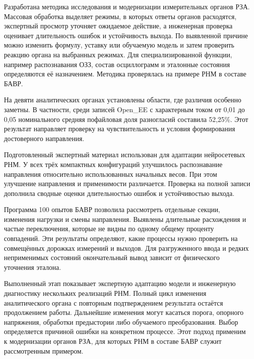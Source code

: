 Разработана методика исследования и модернизации измерительных органов РЗА. Массовая
обработка выделяет режимы, в которых ответы органов расходятся, экспертный просмотр
уточняет ожидаемое действие, а инженерная проверка оценивает длительность ошибок и
устойчивость выхода. По выявленной причине можно изменить формулу, уставку или обучаемую
модель и затем проверить реакцию органа на выбранных режимах. Для специализированной
функции, например распознавания ОЗЗ, состав осциллограмм и эталонные состояния
определяются её назначением. Методика проверялась на примере РНМ в составе БАВР.

На девяти аналитических органах установлены области,
где различия особенно заметны. В частности, среди записей
Open\_EE с характерным током от 0,01 до 0,05 номинального
средняя пофайловая доля разногласий составила 52,25\%.
Этот результат направляет проверку на чувствительность
и условия формирования достоверного направления.

Подготовленный экспертный материал использован
для адаптации нейросетевых РНМ. У всех трёх компактных
конфигураций улучшилось распознавание направления
относительно использованных начальных весов.
При этом улучшение направления и применимости различается.
Проверка на полной записи дополнила сводные оценки
длительностью ошибок и устойчивостью выхода.

Программа 100 опытов БАВР позволила рассмотреть
отдельные секции, изменения нагрузки и смены направления.
Выявлены длительные расхождения и частые переключения,
которые не видны по одному общему проценту совпадений.
Эти результаты определяют, какие процессы нужно
проверить на совмещённых дорожках измерений и выходов.
Для разгруженного ввода и редких неприменимых состояний
окончательный вывод зависит от физического уточнения эталона.

Выполненный этап показывает экспертную адаптацию модели
и инженерную диагностику нескольких реализаций РНМ.
Полный цикл изменения аналитического органа
с повторным подтверждением результата остаётся продолжением работы.
Дальнейшие изменения могут касаться порога, опорного напряжения,
обработки предыстории либо обучаемого преобразования.
Выбор определяется причиной ошибки на конкретном процессе.
Этот подход применим к модернизации органов РЗА,
для которых РНМ в составе БАВР служит рассмотренным примером.

{}
